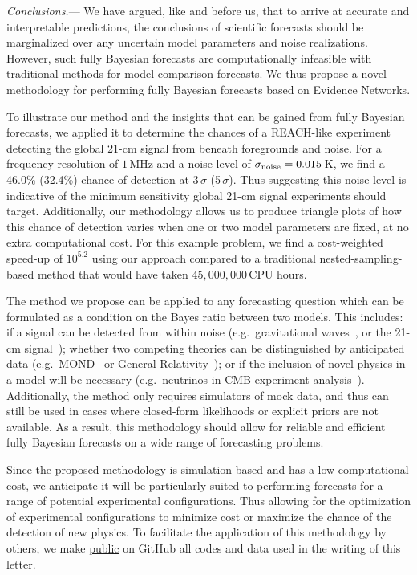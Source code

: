\documentclass[twocolumn,english,aps,prd,amsmath,amssymb,reprint,floatfix,nofootinbib,showkeys]{revtex4-2}
\newif\ifhighlightchanges
\newcommand{\change}[1]{{\ifhighlightchanges\color{red} #1\else #1\fi}}
\begin{document}
\textit{Conclusions.}---
We have argued\change{, like \citet{Mukherjee_2006} and \citet{Trotta_2007b} before us,} that to arrive at accurate and interpretable predictions\change{,} the conclusions of scientific forecasts should be marginalized over any uncertain model parameters and noise realizations.
However, such fully Bayesian forecasts are computationally infeasible with traditional methods \change{for model comparison forecasts}. 
We thus propose a novel methodology for performing fully Bayesian forecasts based on Evidence Networks.

To illustrate our method and the insights that can be gained from fully Bayesian forecasts, we applied it to determine the chances of a REACH-like experiment detecting the global 21-cm signal \change{from beneath foregrounds and noise}.
For a frequency resolution of $1$\,MHz and a noise level of \change{$\sigma_{\rm noise} = 0.015$\,K}, we find a \change{46.0}\% (\change{32.4}\%) chance of detection at 3\,$\sigma$ (5\,$\sigma$). 
Thus suggesting this noise level is indicative of the minimum sensitivity global 21-cm signal experiments should target. 
Additionally, our methodology allows us to produce triangle plots of how this chance of detection varies when one or two model parameters are fixed, at no extra computational cost. 
For this example problem, we find a cost-weighted speed-up of \change{$10^{5.2}$} using our approach compared to a traditional nested-sampling-based method that would have taken \change{$45,000,000$}\,CPU hours.

The method we propose can be applied to any forecasting question which can be formulated as a condition on the Bayes ratio between two models. 
This includes: if a signal can be detected from within noise (e.g.\ gravitational waves~\citep{CosmicExplorer}, or the 21-cm signal~\citep{Furlanetto_2006}); whether two competing theories can be distinguished by anticipated data (e.g.\ MOND~\citep{MOND} or General Relativity~\citep{GR}); or if the inclusion of novel physics in a model will be necessary (e.g.\ neutrinos in CMB experiment analysis~\citep{Simons}). 
Additionally, the method only requires simulators of mock data, and thus can still be used in cases where closed-form likelihoods or explicit priors are not available. 
As a result, this methodology should allow for reliable and efficient fully Bayesian forecasts on a wide range of forecasting problems.

Since the proposed methodology is simulation-based and has a low computational cost, we anticipate it will be particularly suited to performing forecasts for a range of potential experimental configurations. 
Thus allowing for the optimization of experimental configurations to minimize cost or maximize the chance of the detection of new physics. 
To facilitate the application of this methodology by others\change{,} we make \href{https://github.com/ThomasGesseyJones/FullyBayesianForecastsExample}{public} on GitHub all codes and data used in the writing of this letter.
\end{document}
